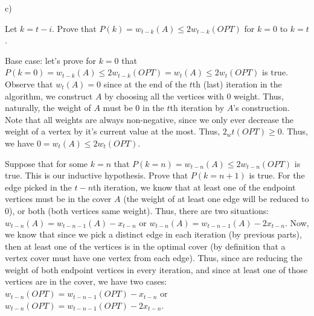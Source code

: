 \documentclass{article}
\begin{document}
c)

Let $k = t - i$. Prove that $P(k) = w_{t-k}(A) \leq 2w_{t-k}(OPT)$ for $k = 0$ to $k = t$.

Base case: let's prove for $k = 0$ that $P(k=0) = w_{t-k}(A) \leq 2w_{t-k}(OPT) = w_{t}(A) \leq 2w_{t}(OPT)$ is true.
Observe that $w_{t}(A) = 0$ since at the end of the $t$th (last) iteration in the algorithm, we construct $A$ by
choosing all the vertices with 0 weight. Thus, naturally, the weight of $A$ must be 0 in the $t$th iteration by $A$'s
construction. Note that all weights are always non-negative, since we only ever decrease the weight of a vertex by it's
current value at the most.  Thus, $2_w{t}(OPT) \geq 0$. Thus, we have $0 = w_{t}(A) \leq 2w_{t}(OPT)$.

Suppose that for some $k = n$ that $P(k=n) = w_{t-n}(A) \leq 2w_{t-n}(OPT)$ is true. This is our inductive hypothesis.
Prove that $P(k=n+1)$ is true. For the edge picked in the $t-n$th iteration, we know that at least one of the endpoint
vertices must be in the cover $A$ (the weight of at least one edge will be reduced to 0), or both (both vertices same
weight). Thus, there are two situations: $w_{t-n}(A) = w_{t-n-1}(A) - x_{t-n}$ or $w_{t-n}(A) = w_{t-n-1}(A) - 2x_{t-n}$.
Now, we know that since we pick a distinct edge in each iteration (by previous parts), then at least one of the vertices
is in the optimal cover (by definition that a vertex cover must have one vertex from each edge). Thus, since are
reducing the weight of both endpoint vertices in every iteration, and since at least one of those vertices are in the
cover, we have two cases: $w_{t-n}(OPT) = w_{t-n-1}(OPT) - x_{t-n}$ or $w_{t-n}(OPT) = w_{t-n-1}(OPT) - 2x_{t-n}$.
\end{document}
